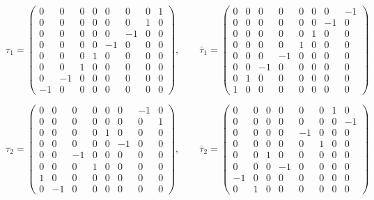 \documentclass[
  10pt,
]{article}
\begin{document}
\[
\tau_1 = \begin{pmatrix} 0 & 0 & 0 & 0 & 0 & 0 & 0 & 1 \\ 0 & 0 & 0 & 0 & 0 & 0 & 1 & 0 \\ 0 & 0 & 0 & 0 & 0 & -1 & 0 & 0 \\ 0 & 0 & 0 & 0 & -1 & 0 & 0 & 0 \\ 0 & 0 & 0 & 1 & 0 & 0 & 0 & 0 \\ 0 & 0 & 1 & 0 & 0 & 0 & 0 & 0 \\ 0 & -1 & 0 & 0 & 0 & 0 & 0 & 0 \\ -1 & 0 & 0 & 0 & 0 & 0 & 0 & 0 \end{pmatrix},\qquad \bar\tau_1 = \begin{pmatrix} 0 & 0 & 0 & 0 & 0 & 0 & 0 & -1 \\ 0 & 0 & 0 & 0 & 0 & 0 & -1 & 0 \\ 0 & 0 & 0 & 0 & 0 & 1 & 0 & 0 \\ 0 & 0 & 0 & 0 & 1 & 0 & 0 & 0 \\ 0 & 0 & 0 & -1 & 0 & 0 & 0 & 0 \\ 0 & 0 & -1 & 0 & 0 & 0 & 0 & 0 \\ 0 & 1 & 0 & 0 & 0 & 0 & 0 & 0 \\ 1 & 0 & 0 & 0 & 0 & 0 & 0 & 0 \end{pmatrix}
\]

\[
\tau_2 = \begin{pmatrix} 0 & 0 & 0 & 0 & 0 & 0 & -1 & 0 \\ 0 & 0 & 0 & 0 & 0 & 0 & 0 & 1 \\ 0 & 0 & 0 & 0 & 1 & 0 & 0 & 0 \\ 0 & 0 & 0 & 0 & 0 & -1 & 0 & 0 \\ 0 & 0 & -1 & 0 & 0 & 0 & 0 & 0 \\ 0 & 0 & 0 & 1 & 0 & 0 & 0 & 0 \\ 1 & 0 & 0 & 0 & 0 & 0 & 0 & 0 \\ 0 & -1 & 0 & 0 & 0 & 0 & 0 & 0 \end{pmatrix},\qquad \bar\tau_2 = \begin{pmatrix} 0 & 0 & 0 & 0 & 0 & 0 & 1 & 0 \\ 0 & 0 & 0 & 0 & 0 & 0 & 0 & -1 \\ 0 & 0 & 0 & 0 & -1 & 0 & 0 & 0 \\ 0 & 0 & 0 & 0 & 0 & 1 & 0 & 0 \\ 0 & 0 & 1 & 0 & 0 & 0 & 0 & 0 \\ 0 & 0 & 0 & -1 & 0 & 0 & 0 & 0 \\ -1 & 0 & 0 & 0 & 0 & 0 & 0 & 0 \\ 0 & 1 & 0 & 0 & 0 & 0 & 0 & 0 \end{pmatrix}
\]
\end{document}
